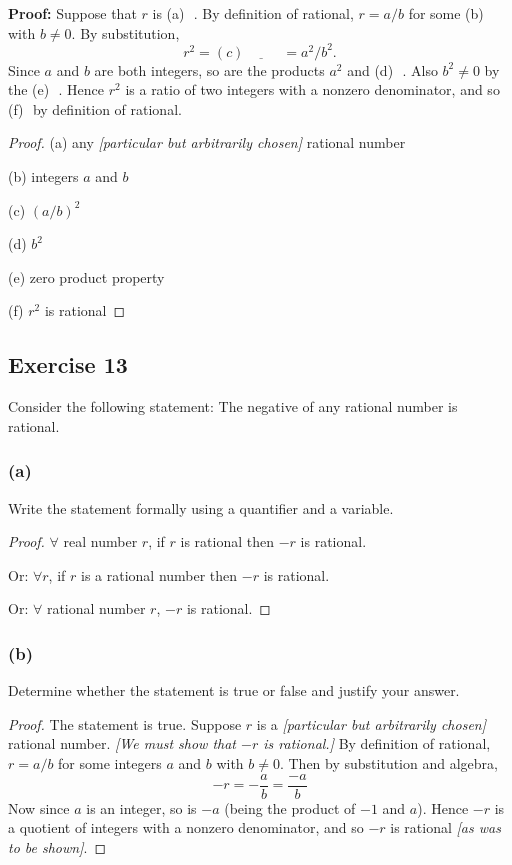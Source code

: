 \documentclass[14pt]{extarticle}
\newcommand{\fbl}{\underline{\hspace{1cm}}\,\,}
\newcommand{\fa}{\forall}
\begin{document}
{\bf Proof:} Suppose that $r$ is (a) \fbl. By definition of rational, $r = a/b$ for some (b) \fbl with $b \neq 0$. By substitution,
\[
r^2 = (c) \fbl = a^2/b^2.
\]
Since $a$ and $b$ are both integers, so are the products $a^2$ and (d) \fbl. Also $b^2 \neq 0$ by the (e) \fbl. Hence $r^2$ is a ratio of two integers with a nonzero denominator, and so (f) \fbl by definition of rational.

\begin{proof}
(a) any {\it [particular but arbitrarily chosen]} rational number

(b) integers $a$ and $b$

(c) $(a/b)^2$

(d) $b^2$

(e) zero product property

(f) $r^2$ is rational
\end{proof}

\subsection{Exercise 13}
Consider the following statement: The negative of any rational number is rational.

\subsubsection{(a)}
Write the statement formally using a quantifier and a variable.

\begin{proof}
$\fa$ real number $r$, if $r$ is rational then $-r$ is rational.

Or: $\fa r$, if $r$ is a rational number then $-r$ is rational.

Or: $\fa$ rational number $r$, $-r$ is rational.
\end{proof}

\subsubsection{(b)}
Determine whether the statement is true or false and justify your answer.

\begin{proof}
The statement is true. Suppose $r$ is a {\it [particular but arbitrarily chosen]} rational number. {\it [We must show that $-r$ is rational.]} By definition of rational, $r = a/b$ for some integers $a$ and $b$ with $b \neq 0$. Then by substitution and algebra,
\[
-r = -\frac{a}{b} = \frac{-a}{b}
\]
Now since $a$ is an integer, so is $-a$ (being the product of $-1$ and $a$). Hence $-r$ is a quotient of integers with a nonzero denominator, and so $-r$ is rational {\it [as was to be shown]}.
\end{proof}
\end{document}
